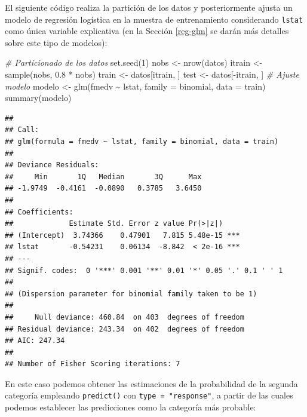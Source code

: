 \documentclass[
]{book}
\newenvironment{Shaded}{\begin{snugshade}}{\end{snugshade}}
\newcommand{\AttributeTok}[1]{\textcolor[rgb]{0.77,0.63,0.00}{#1}}
\newcommand{\CommentTok}[1]{\textcolor[rgb]{0.56,0.35,0.01}{\textit{#1}}}
\newcommand{\DecValTok}[1]{\textcolor[rgb]{0.00,0.00,0.81}{#1}}
\newcommand{\FloatTok}[1]{\textcolor[rgb]{0.00,0.00,0.81}{#1}}
\newcommand{\FunctionTok}[1]{\textcolor[rgb]{0.00,0.00,0.00}{#1}}
\newcommand{\NormalTok}[1]{#1}
\newcommand{\OtherTok}[1]{\textcolor[rgb]{0.56,0.35,0.01}{#1}}
\newcommand{\SpecialCharTok}[1]{\textcolor[rgb]{0.00,0.00,0.00}{#1}}
\theoremstyle{break}
\theoremstyle{definition}
\theoremstyle{definition}
\theoremstyle{definition}
\theoremstyle{definition}
\theoremstyle{remark}
\begin{document}
El siguiente código realiza la partición de los datos y posteriormente ajusta un modelo de regresión logística en la muestra de entrenamiento considerando \texttt{lstat} como única variable explicativa (en la Sección \ref{reg-glm} se darán más detalles sobre este tipo de modelos):

\begin{Shaded}
\begin{Highlighting}[]
\CommentTok{\# Particionado de los datos}
\FunctionTok{set.seed}\NormalTok{(}\DecValTok{1}\NormalTok{)}
\NormalTok{nobs }\OtherTok{\textless{}{-}} \FunctionTok{nrow}\NormalTok{(datos)}
\NormalTok{itrain }\OtherTok{\textless{}{-}} \FunctionTok{sample}\NormalTok{(nobs, }\FloatTok{0.8} \SpecialCharTok{*}\NormalTok{ nobs)}
\NormalTok{train }\OtherTok{\textless{}{-}}\NormalTok{ datos[itrain, ]}
\NormalTok{test }\OtherTok{\textless{}{-}}\NormalTok{ datos[}\SpecialCharTok{{-}}\NormalTok{itrain, ]}
\CommentTok{\# Ajuste modelo}
\NormalTok{modelo }\OtherTok{\textless{}{-}} \FunctionTok{glm}\NormalTok{(fmedv }\SpecialCharTok{\textasciitilde{}}\NormalTok{ lstat, }\AttributeTok{family =}\NormalTok{ binomial, }\AttributeTok{data =}\NormalTok{ train)}
\FunctionTok{summary}\NormalTok{(modelo)}
\end{Highlighting}
\end{Shaded}

\begin{verbatim}
## 
## Call:
## glm(formula = fmedv ~ lstat, family = binomial, data = train)
## 
## Deviance Residuals: 
##     Min       1Q   Median       3Q      Max  
## -1.9749  -0.4161  -0.0890   0.3785   3.6450  
## 
## Coefficients:
##             Estimate Std. Error z value Pr(>|z|)    
## (Intercept)  3.74366    0.47901   7.815 5.48e-15 ***
## lstat       -0.54231    0.06134  -8.842  < 2e-16 ***
## ---
## Signif. codes:  0 '***' 0.001 '**' 0.01 '*' 0.05 '.' 0.1 ' ' 1
## 
## (Dispersion parameter for binomial family taken to be 1)
## 
##     Null deviance: 460.84  on 403  degrees of freedom
## Residual deviance: 243.34  on 402  degrees of freedom
## AIC: 247.34
## 
## Number of Fisher Scoring iterations: 7
\end{verbatim}

En este caso podemos obtener las estimaciones de la probabilidad de la segunda categoría empleando \texttt{predict()} con \texttt{type\ =\ "response"}, a partir de las cuales podemos establecer las predicciones como la categoría más probable:
\end{document}
